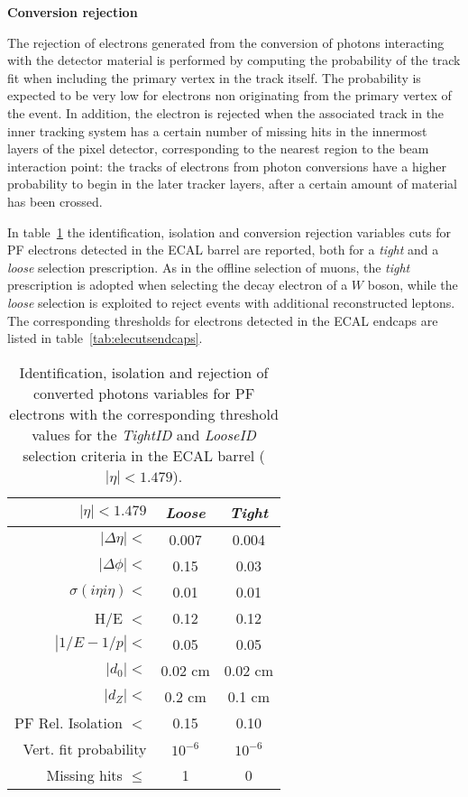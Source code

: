 \smallskip

\textbf{Conversion rejection}

The rejection of electrons generated from the conversion of photons 
interacting with the detector material is performed by computing the 
probability of the track fit when including the primary vertex in the track itself. 
The probability is expected to be very low for electrons non originating from the 
primary vertex of the event.
In addition, the electron is rejected when the associated track in 
the inner tracking system has a certain number of missing hits 
in the innermost layers of the pixel detector, corresponding to the nearest 
region to the beam interaction point: the tracks of electrons from photon 
conversions have a higher probability to begin in the later tracker layers, 
after a certain amount of material has been crossed. \\

\bigskip

In table~\ref{tab:elecutsbarrel} the identification, isolation and conversion rejection 
variables cuts for PF electrons 
detected in the ECAL barrel are reported, both for a \textit{tight} and a 
\textit{loose} selection prescription. 
As in the offline selection of muons, the \textit{tight} prescription 
is adopted when selecting the decay electron of a $W$ boson, while 
the \textit{loose} selection is exploited to reject events with additional 
reconstructed leptons.
The corresponding thresholds 
for electrons detected in the 
ECAL endcaps are listed in table~\ref{tab:elecutsendcaps}.

\begin{table}[h]
\begin{center}
\begin{tabular}{rcc}
\hline
$|\eta| < 1.479$ & \textit{Loose} & \textit{Tight}\\
\hline
$|\Delta\eta| <$ & 0.007 & 0.004\\
$|\Delta\phi| <$  & 0.15 & 0.03 \\
$\sigma(i\eta i\eta) <$   & 0.01 & 0.01 \\
H/E $<$  & 0.12 & 0.12 \\
$|1/E - 1/p| <$   & 0.05 & 0.05 \\
\hline
$|d_{0}| <$ & 0.02 cm & 0.02 cm \\
$|d_{Z}| <$  & 0.2 cm & 0.1 cm \\
\hline
PF Rel. Isolation $<$ & 0.15 & 0.10 \\
\hline
Vert. fit probability  & $10^{-6}$ & $10^{-6}$\\
Missing hits $\leq$    & 1 & 0\\
 \hline
\end{tabular}
\end{center}
\caption{Identification, isolation and rejection of converted photons
  variables for PF electrons with the corresponding threshold values for 
  the \textit{TightID} and \textit{LooseID} selection criteria in the 
  ECAL barrel ($|\eta| < 1.479$).}
\label{tab:elecutsbarrel}
\end{table}

